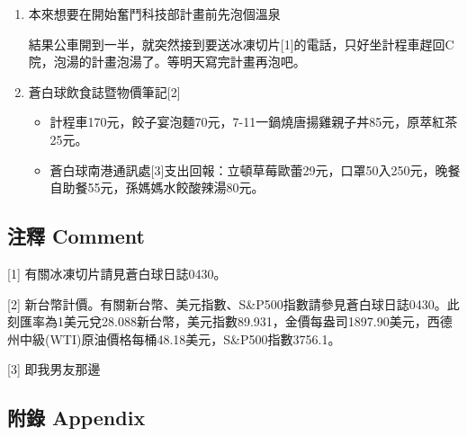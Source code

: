 \documentclass[
]{article}
\providecommand{\tightlist}{%
  \setlength{\itemsep}{0pt}\setlength{\parskip}{0pt}}
\begin{document}
\begin{enumerate}
\def\labelenumi{\arabic{enumi}.}
\item
  本來想要在開始奮鬥科技部計畫前先泡個溫泉

  結果公車開到一半，就突然接到要送冰凍切片{[}1{]}的電話，只好坐計程車趕回C院，泡湯的計畫泡湯了。等明天寫完計畫再泡吧。
\item
  蒼白球飲食誌暨物價筆記{[}2{]}

  \begin{itemize}
  \tightlist
  \item
    計程車170元，餃子宴泡麵70元，7-11一鍋燒唐揚雞親子丼85元，原萃紅茶25元。
  \item
    蒼白球南港通訊處{[}3{]}支出回報：立頓草莓歐蕾29元，口罩50入250元，晚餐自助餐55元，孫媽媽水餃酸辣湯80元。
  \end{itemize}
\end{enumerate}

\hypertarget{ux6ce8ux91cb-comment-30}{%
\subsection{注釋 Comment}\label{ux6ce8ux91cb-comment-30}}

{[}1{]} 有關冰凍切片請見蒼白球日誌0430。

{[}2{]}
新台幣計價。有關新台幣、美元指數、S\&P500指數請參見蒼白球日誌0430。此刻匯率為1美元兌28.088新台幣，美元指數89.931，金價每盎司1897.90美元，西德州中級(WTI)原油價格每桶48.18美元，S\&P500指數3756.1。

{[}3{]} 即我男友那邊

\hypertarget{ux9644ux9304-appendix-30}{%
\subsection{附錄 Appendix}\label{ux9644ux9304-appendix-30}}
\end{document}
